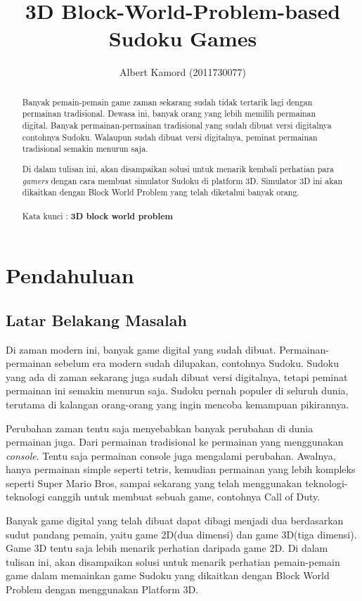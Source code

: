 \documentclass[11pt,a4paper]{report}
\author{Albert Kamord (2011730077)}
\title{3D Block-World-Problem-based Sudoku Games}
\begin{document}
\maketitle
\begin{abstract}

\indent Banyak pemain-pemain game zaman sekarang sudah tidak tertarik lagi dengan permainan tradisional. Dewasa ini, banyak orang yang lebih memilih permainan digital. Banyak permainan-permainan tradisional yang sudah dibuat versi digitalnya contohnya Sudoku. Walaupun sudah dibuat versi digitalnya, peminat permainan tradisional semakin menurun saja.

\indent Di dalam tulisan ini, akan disampaikan solusi untuk menarik kembali perhatian para \textit{gamers} dengan cara membuat simulator Sudoku di platform 3D. Simulator 3D ini akan dikaitkan dengan Block World Problem yang telah diketahui banyak orang. \\
\\
Kata kunci : \textbf{3D block world problem}
\end{abstract}

\tableofcontents \newpage 	%
\listoffigures \newpage 	%


\chapter{Pendahuluan} %
\section{Latar Belakang Masalah}
\indent Di zaman modern ini, banyak game digital yang sudah dibuat. Permainan-permainan sebelum era modern sudah dilupakan, contohnya Sudoku. Sudoku yang ada di zaman sekarang juga sudah dibuat versi digitalnya, tetapi peminat permainan ini semakin menurun saja. Sudoku pernah populer di seluruh dunia, terutama di kalangan orang-orang yang ingin mencoba kemampuan pikirannya.

\indent Perubahan zaman tentu saja menyebabkan banyak perubahan di dunia permainan juga. Dari permainan tradisional ke permainan yang menggunakan \textit{console}. Tentu saja permainan console juga mengalami perubahan. Awalnya, hanya permainan simple seperti tetris, kemudian permainan yang lebih kompleks seperti Super Mario Bros, sampai sekarang yang telah menggunakan teknologi-teknologi canggih untuk membuat sebuah game, contohnya Call of Duty.

\indent Banyak game digital yang telah dibuat dapat dibagi menjadi dua berdasarkan sudut pandang pemain, yaitu game 2D(dua dimensi) dan game 3D(tiga dimensi). Game 3D tentu saja lebih menarik perhatian daripada game 2D. Di dalam tulisan ini, akan disampaikan solusi untuk menarik perhatian pemain-pemain game dalam memainkan game Sudoku yang dikaitkan dengan Block World Problem dengan menggunakan Platform 3D.
\end{document}
